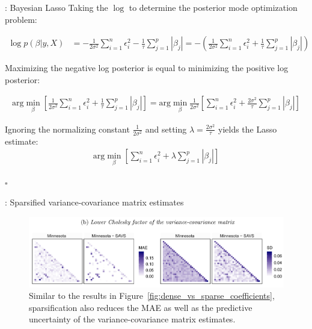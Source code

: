 \begin{frame}[allowframebreaks]{: Bayesian Lasso}
    Taking the $\log$ to determine the posterior mode optimization problem:

    \begin{align*}
        \log p(\beta|y,X) & = - \frac{1}{2 \sigma^2} \sum_{i = 1}^{n} \epsilon_i^2 - \frac{1}{\tau} \sum_{j = 1}^{p} |\beta_j| = - \left( \frac{1}{2 \sigma^2} \sum_{i = 1}^{n} \epsilon_i^2 + \frac{1}{\tau} \sum_{j = 1}^{p} |\beta_j| \right)
    \end{align*}

    Maximizing the negative log posterior is equal to minimizing the positive log posterior:

    \begin{align*}
        \text{arg} \min_{\beta} \left[ \frac{1}{2 \sigma^2} \sum_{i = 1}^{n} \epsilon_i^2 + \frac{1}{\tau} \sum_{j = 1}^{p} |\beta_j| \right] = \text{arg} \min_{\beta} \frac{1}{2 \sigma^2} \left[ \sum_{i = 1}^{n} \epsilon_i^2 + \frac{2 \sigma^2}{\tau} \sum_{j = 1}^{p} |\beta_j| \right]
    \end{align*}

    Ignoring the normalizing constant $\frac{1}{2 \sigma^2}$ and setting $\lambda = \frac{2 \sigma^2}{\tau}$ yields the Lasso estimate:
    \begin{align*}
        \text{arg} \min_{\beta} \left[ \sum_{i = 1}^{n} \epsilon_i^2 + \lambda \sum_{j = 1}^{p} |\beta_j| \right]
    \end{align*}

    \hfill$\square$
\end{frame}

\begin{frame}{: Sparsified variance-covariance matrix estimates}
    \begin{figure}
        \centering
        \includegraphics[width=1\textwidth]{plots/sparsity_covariance_matrix.png}
        \caption{Similar to the results in Figure~\ref{fig:dense_vs_sparse_coefficients}, sparsification also reduces the MAE as well as the predictive uncertainty of the variance-covariance matrix estimates.}
        \label{fig:dense_vs_sparse_covariance_matriy}
    \end{figure}
\end{frame}

